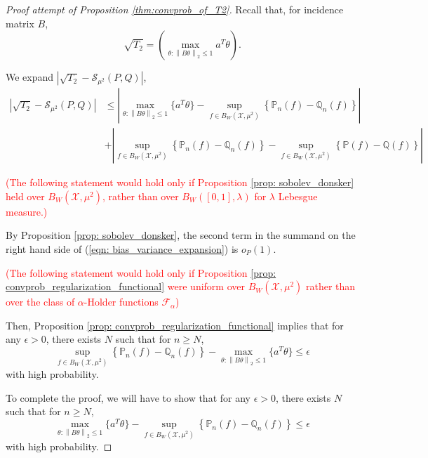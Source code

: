 \documentclass{article}
\newcommand{\norm}[1]{\left\lVert#1\right\rVert}
\newcommand{\abs}[1]{\left \lvert #1 \right \rvert}
\newcommand{\F}{\mathcal{F}}
\newcommand{\X}{\mathcal{X}}
\theoremstyle{alden}
\theoremstyle{definition}
\theoremstyle{remark}
\begin{document}
\begin{proof}[Proof attempt of Proposition \ref{thm:convprob_of_T2}]
	Recall that, for incidence matrix $B$, 
	\begin{equation*}
	\sqrt{T_2} = \left(\max_{\theta: \norm{B\theta}_2 \leq 1} a^T \theta \right).
	\end{equation*}
	
	We expand $\abs{\sqrt{T_2} - \mathcal{S}_{\mu^2}(P,Q)}$,
	\begin{align}
	\label{eqn: bias_variance_expansion}
	\abs{\sqrt{T_2} - \mathcal{S}_{\mu^2}(P,Q)} & \leq \abs{\max_{\theta: \norm{B\theta}_2 \leq 1} \bigl\{a^T \theta \bigr\} - \sup_{f \in B_W(\X, \mu^2)} \left\{ \mathbb{P}_n(f) - \mathbb{Q}_n(f) \right\} } \nonumber \\
	& + \abs{\sup_{f \in B_W(\X, \mu^2)} \left\{ \mathbb{P}_n(f) - \mathbb{Q}_n(f) \right\} - \sup_{f \in B_W(\X, \mu^2)} \left\{ \mathbb{P}(f) - \mathbb{Q}(f) \right\} }
	\end{align}
	
	\textcolor{red}{(The following statement would hold only if Proposition \ref{prop: sobolev_donsker} held over $B_W(\X, \mu^2)$, rather than over $B_W([0,1], \lambda)$ for $\lambda$ Lebesgue measure.)}
	
	By Proposition \ref{prop: sobolev_donsker}, the second term in the summand on the right hand side of (\ref{eqn: bias_variance_expansion}) is $o_P(1)$.
	
	\textcolor{red}{(The following statement would hold only if Proposition \ref{prop: convprob_regularization_functional} were uniform over $B_W(\X, \mu^2)$ rather than over the class of $\alpha$-Holder functions $\F_{\alpha}$)}
	
	Then, Proposition \ref{prop: convprob_regularization_functional} implies that for any $\epsilon > 0$, there exists $N$ such that for $n \geq N$, 
	\begin{equation*}
	\sup_{f \in B_W(\X, \mu^2)} \left\{ \mathbb{P}_n(f) - \mathbb{Q}_n(f) \right\} - \max_{\theta: \norm{B\theta}_2 \leq 1} \bigl\{a^T \theta \bigr\} \leq \epsilon
	\end{equation*}
	with high probability. 
	
	To complete the proof, we will have to show that for any $\epsilon > 0$, there exists $N$ such that for $n \geq N$, 
	\begin{equation*}
	\max_{\theta: \norm{B\theta}_2 \leq 1} \bigl\{a^T \theta \bigr\} - \sup_{f \in B_W(\X, \mu^2)} \left\{ \mathbb{P}_n(f) - \mathbb{Q}_n(f) \right\} \leq \epsilon
	\end{equation*}
	with high probability.
	
	
\end{proof}
\end{document}
